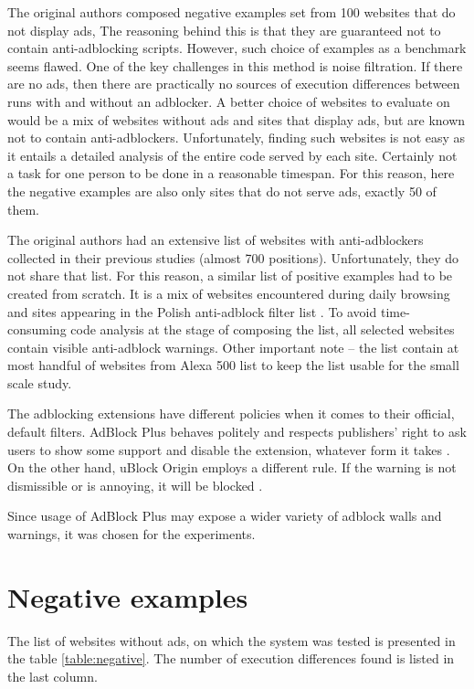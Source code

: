 The original authors composed negative examples set from 100 websites that do not display ads,
The reasoning behind this is that they are guaranteed not to contain anti-adblocking scripts.
However, such choice of examples as a benchmark seems flawed.
One of the key challenges in this method is noise filtration. If there are no ads, 
then there are practically no sources of execution differences between runs with and without an adblocker.
A better choice of websites to evaluate on would be a mix of websites without ads and sites that
display ads, but are known not to contain anti-adblockers.
Unfortunately, finding such websites is not easy as it entails a detailed analysis of the entire code
served by each site. Certainly not a task for one person to be done in a reasonable timespan.
For this reason, here the negative examples are also only sites that do not serve ads, exactly 50 of them.

The original authors had an extensive list of websites with anti-adblockers collected in their
previous studies (almost 700 positions). Unfortunately, they do not share that list. 
For this reason, a similar list of positive examples had to be created from scratch.
It is a mix of websites encountered during daily browsing and sites appearing in the
Polish anti-adblock filter list \cite{github:anti-adblock-list}.
To avoid time-consuming code analysis at the stage of composing the list, 
all selected websites contain visible anti-adblock warnings.
Other important note -- the list contain at most handful of websites from Alexa 500 list \cite{alexa-list} to keep the list
usable for the small scale study.

The adblocking extensions have different policies when it comes to their official, default filters.
AdBlock Plus behaves politely and respects publishers' right to ask users to show some support
and disable the extension, whatever form it takes \cite{adblock:policy}.
On the other hand, uBlock Origin employs a different rule. If the warning is not dismissible or is annoying,
it will be blocked \cite{vice:ublock-policy}.

Since usage of AdBlock Plus may expose a wider variety of adblock walls and warnings, 
it was chosen for the experiments.

\section{Negative examples}

The list of websites without ads, on which the system was tested is presented in the table \ref{table:negative}.
The number of execution differences found is listed in the last column.

